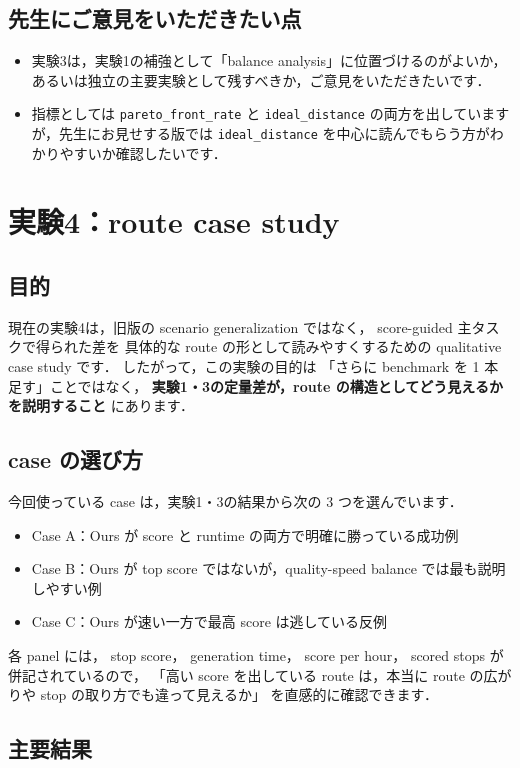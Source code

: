 \documentclass[a4paper,11pt]{article}
\begin{document}
\subsection*{先生にご意見をいただきたい点}
\begin{itemize}
    \item 実験3は，実験1の補強として「balance analysis」に位置づけるのがよいか，あるいは独立の主要実験として残すべきか，ご意見をいただきたいです．
    \item 指標としては \texttt{pareto\_front\_rate} と \texttt{ideal\_distance} の両方を出していますが，先生にお見せする版では \texttt{ideal\_distance} を中心に読んでもらう方がわかりやすいか確認したいです．
\end{itemize}

\clearpage
\section{実験4：route case study}
\subsection*{目的}
現在の実験4は，旧版の scenario generalization ではなく，
score-guided 主タスクで得られた差を
具体的な route の形として読みやすくするための qualitative case study です．
したがって，この実験の目的は
「さらに benchmark を 1 本足す」ことではなく，
\textbf{実験1・3の定量差が，route の構造としてどう見えるかを説明すること}
にあります．

\subsection*{case の選び方}
今回使っている case は，実験1・3の結果から次の 3 つを選んでいます．
\begin{itemize}
    \item Case A：Ours が score と runtime の両方で明確に勝っている成功例
    \item Case B：Ours が top score ではないが，quality-speed balance では最も説明しやすい例
    \item Case C：Ours が速い一方で最高 score は逃している反例
\end{itemize}

各 panel には，
stop score，
generation time，
score per hour，
scored stops が併記されているので，
「高い score を出している route は，本当に route の広がりや stop の取り方でも違って見えるか」
を直感的に確認できます．

\subsection*{主要結果}
\end{document}

